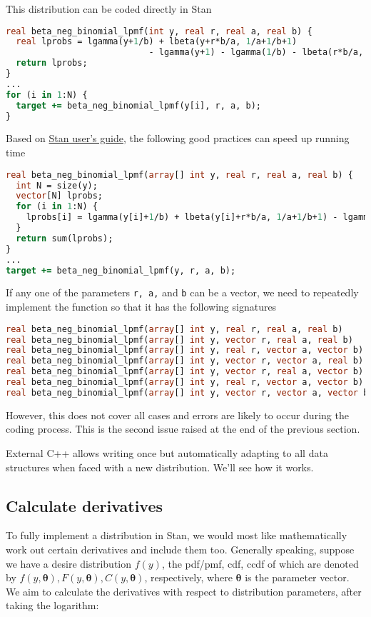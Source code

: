 \documentclass[11pt]{article}
\begin{document}
This distribution can be coded directly in Stan
\begin{lstlisting}[language=Stan, style=lgeneral]
real beta_neg_binomial_lpmf(int y, real r, real a, real b) {
  real lprobs = lgamma(y+1/b) + lbeta(y+r*b/a, 1/a+1/b+1) 
  							- lgamma(y+1) - lgamma(1/b) - lbeta(r*b/a, 1/a+1);
  return lprobs;
}
...
for (i in 1:N) {
  target += beta_neg_binomial_lpmf(y[i], r, a, b);
}
\end{lstlisting}
Based on \href{https://mc-stan.org/docs/stan-users-guide/vectorization.html}{Stan user's guide}, the following good practices can speed up running time
\begin{lstlisting}[language=Stan, style=lgeneral]
real beta_neg_binomial_lpmf(array[] int y, real r, real a, real b) {
  int N = size(y);
  vector[N] lprobs;
  for (i in 1:N) {
    lprobs[i] = lgamma(y[i]+1/b) + lbeta(y[i]+r*b/a, 1/a+1/b+1) - lgamma(y[i]+1) - lgamma(1/b) - lbeta(r*b/a, 1/a+1);
  }
  return sum(lprobs);
}
...
target += beta_neg_binomial_lpmf(y, r, a, b);
\end{lstlisting}

If any one of the parameters \verb|r, a,| and \verb|b| can be a vector, we need to repeatedly implement the function so that it has the following signatures
\begin{lstlisting}[language=Stan, style=lgeneral]
real beta_neg_binomial_lpmf(array[] int y, real r, real a, real b)
real beta_neg_binomial_lpmf(array[] int y, vector r, real a, real b)
real beta_neg_binomial_lpmf(array[] int y, real r, vector a, vector b)
real beta_neg_binomial_lpmf(array[] int y, vector r, vector a, real b)
real beta_neg_binomial_lpmf(array[] int y, vector r, real a, vector b)
real beta_neg_binomial_lpmf(array[] int y, real r, vector a, vector b)
real beta_neg_binomial_lpmf(array[] int y, vector r, vector a, vector b)
\end{lstlisting}
However, this does not cover all cases and errors are likely to occur during the coding process. This is the second issue raised at the end of the previous section.

External C++ allows writing once but automatically adapting to all data structures when faced with a new distribution. We'll see how it works.



\subsection{Calculate derivatives}

To fully implement a distribution in Stan, we would most like mathematically work out certain derivatives and include them too. Generally speaking, suppose we have a desire distribution $f(y)$, the pdf/pmf, cdf, ccdf of which are denoted by $f(y,\boldsymbol\theta), F(y,\boldsymbol\theta), C(y,\boldsymbol\theta)$, respectively, where $\boldsymbol\theta$ is the parameter vector. We aim to calculate the derivatives with respect to distribution parameters, after taking the logarithm:
\end{document}
